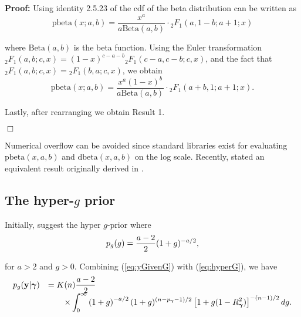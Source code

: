  
\noindent 
{\bf Proof:} Using identity 2.5.23 of \cite{Abramowitz1972} the cdf of the beta distribution
can be written as
\begin{equation*}
\mbox{pbeta}(x;a,b) = \frac{x^a}{a\mbox{Beta}(a,b)} \cdot {}_2F_1(a,1-b;a+1;x) 
\end{equation*}

\noindent where 
$\mbox{Beta}(a,b)$ is the beta function.
Using the Euler transformation
${}_2 F_1(a,b;c,x) = (1 - x)^{c-a-b} {}_2 F_1(c-a,c-b;c,x)$,
and the fact that ${}_2 F_1(a,b;c,x)={}_2 F_1(b,a;c,x)$,  we obtain
$$
\mbox{pbeta}(x;a,b) = \frac{x^a(1 - x)^{b}}{a\mbox{Beta}(a,b)} \cdot {}_2F_1(a+b,1;a+1;x). 
$$

\noindent Lastly, after rearranging we obtain Result 1.
\vspace{-0.5cm}\begin{flushright}$\Box$\end{flushright}

\noindent Numerical overflow can be avoided since standard libraries exist for
evaluating $\mbox{pbeta}(x,a,b)$ and $\mbox{dbeta}(x,a,b)$ on the log scale.
Recently, \cite{Nadarajah2015} stated an equivalent result originally derived
in \cite{PrudnikovEtal1986}. 

\subsection{The hyper-$g$ prior}

\noindent Initially, \cite{Liang2008} suggest the hyper $g$-prior where
\begin{equation}\label{eq:hyperG}
	\displaystyle p_{g}(g) = \frac{a - 2}{2}(1 + g)^{-a/2},
\end{equation}

\noindent for $a>2$ and $g>0$. Combining (\ref{eq:yGivenG}) with
(\ref{eq:hyperG}), we have
\begin{equation}\label{eq:hyperGmarginalIntegral}
\begin{array}{rl} 
	p_{g}({\bf y}|{\boldsymbol \gamma}) 
	& \displaystyle = K(n) \frac{a - 2}{2}  
	\\
	& \displaystyle \qquad \times \int_0^\infty 
	\left( 1 + g \right)^{-a/2}
	(1 + g)^{(n-p_{\boldsymbol \gamma}-1)/2} \left[ 1 + g (1 - R_{\boldsymbol \gamma}^2) \right]^{-(n-1)/2}  dg.
\end{array} 
\end{equation}

